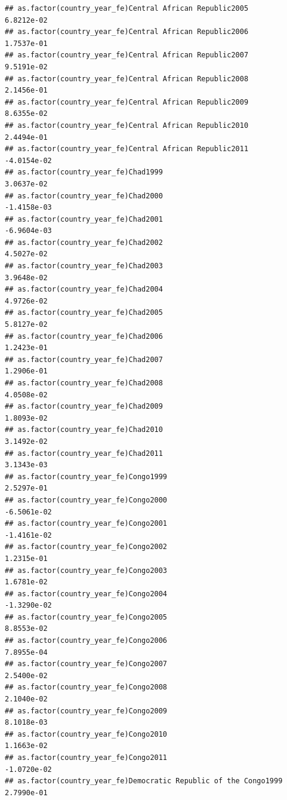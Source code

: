 \documentclass[
  a4paper,
]{article}
\begin{document}
\begin{verbatim}
## as.factor(country_year_fe)Central African Republic2005          6.8212e-02
## as.factor(country_year_fe)Central African Republic2006          1.7537e-01
## as.factor(country_year_fe)Central African Republic2007          9.5191e-02
## as.factor(country_year_fe)Central African Republic2008          2.1456e-01
## as.factor(country_year_fe)Central African Republic2009          8.6355e-02
## as.factor(country_year_fe)Central African Republic2010          2.4494e-01
## as.factor(country_year_fe)Central African Republic2011         -4.0154e-02
## as.factor(country_year_fe)Chad1999                              3.0637e-02
## as.factor(country_year_fe)Chad2000                             -1.4158e-03
## as.factor(country_year_fe)Chad2001                             -6.9604e-03
## as.factor(country_year_fe)Chad2002                              4.5027e-02
## as.factor(country_year_fe)Chad2003                              3.9648e-02
## as.factor(country_year_fe)Chad2004                              4.9726e-02
## as.factor(country_year_fe)Chad2005                              5.8127e-02
## as.factor(country_year_fe)Chad2006                              1.2423e-01
## as.factor(country_year_fe)Chad2007                              1.2906e-01
## as.factor(country_year_fe)Chad2008                              4.0508e-02
## as.factor(country_year_fe)Chad2009                              1.8093e-02
## as.factor(country_year_fe)Chad2010                              3.1492e-02
## as.factor(country_year_fe)Chad2011                              3.1343e-03
## as.factor(country_year_fe)Congo1999                             2.5297e-01
## as.factor(country_year_fe)Congo2000                            -6.5061e-02
## as.factor(country_year_fe)Congo2001                            -1.4161e-02
## as.factor(country_year_fe)Congo2002                             1.2315e-01
## as.factor(country_year_fe)Congo2003                             1.6781e-02
## as.factor(country_year_fe)Congo2004                            -1.3290e-02
## as.factor(country_year_fe)Congo2005                             8.8553e-02
## as.factor(country_year_fe)Congo2006                             7.8955e-04
## as.factor(country_year_fe)Congo2007                             2.5400e-02
## as.factor(country_year_fe)Congo2008                             2.1040e-02
## as.factor(country_year_fe)Congo2009                             8.1018e-03
## as.factor(country_year_fe)Congo2010                             1.1663e-02
## as.factor(country_year_fe)Congo2011                            -1.0720e-02
## as.factor(country_year_fe)Democratic Republic of the Congo1999  2.7990e-01

\end{verbatim}
\end{document}
